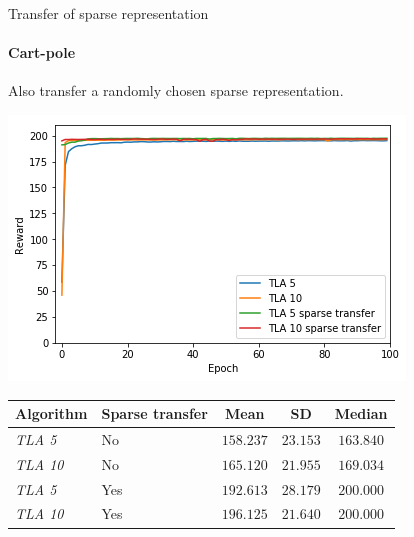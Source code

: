 \begin{frame}[fragile]{Transfer of sparse representation}
\framesubtitle{Cart-pole}
Also transfer a randomly chosen sparse representation.
\begin{center}
    \includegraphics[width=.55\linewidth]{results/CartPole/sparse_transfer/reward_target_without_with.png}
\end{center}
    \begin{tabular}{llccc}
    \hline
    Algorithm & Sparse transfer & Mean & SD & Median \\
    \hline
       \textit{TLA 5} & No & $158.237$ & $23.153$ & $163.840$ \\
       \textit{TLA 10} & No & $165.120$ & $21.955$ & $169.034$ \\
       \textit{TLA 5} & Yes & $192.613$ & $28.179$ & $\bm{200.000}$ \\
       \textit{TLA 10} & Yes & $\bm{196.125}$ & $21.640$ & $\bm{200.000}$ \\
    \hline
    \end{tabular}
\end{frame}

